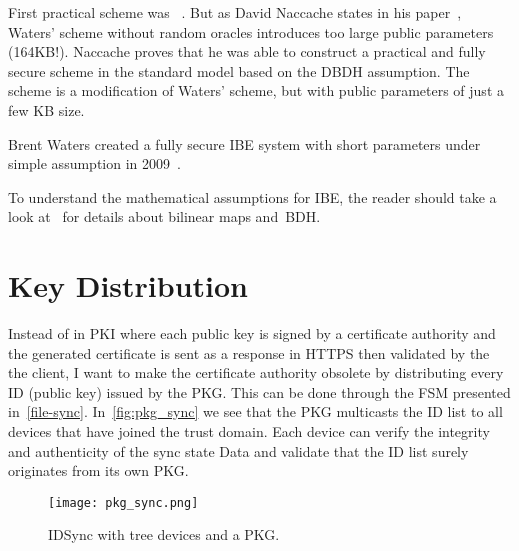 First practical scheme was ~\cite{DBLP:journals/iacr/Waters04}.
But as David Naccache states in his paper~\cite{DBLP:journals/iacr/Naccache05}, Waters' scheme without random oracles introduces too large public parameters (164\gls{KB}!).
Naccache proves that he was able to construct a practical and fully secure scheme in the standard model based on the \gls{DBDH} assumption.
The scheme is a modification of Waters' scheme, but with public parameters of just a few \gls{KB} size.

Brent Waters created a fully secure \gls{IBE} system with short parameters under simple assumption in 2009~\cite{DBLP:conf/crypto/Waters09}.

To understand the mathematical assumptions for \gls{IBE}, the reader should take a look at~\cite[section 3]{DBLP:conf/crypto/BonehF01} for details about bilinear maps and~\gls{BDH}.

\section{Key Distribution}\label{key-distribution}
Instead of in \gls{PKI} where each public key is signed by a certificate authority and the generated certificate is sent as a response in \gls{HTTPS} then validated by the the client, I want to make the certificate authority obsolete by distributing every \gls{ID} (public key) issued by the \gls{PKG}.
This can be done through the \gls{FSM} presented in~\autoref{file-sync}.
In~\autoref{fig:pkg_sync} we see that the \gls{PKG} multicasts the \gls{ID} list to all devices that have joined the trust domain.
Each device can verify the integrity and authenticity of the sync state Data and validate that the \gls{ID} list surely originates from its own \gls{PKG}.
\begin{figure}[ht]
  \centering
  \texttt{[image: pkg\_sync.png]}
  \caption{IDSync with tree devices and a PKG.}
  \label{fig:pkg_sync}
\end{figure}


